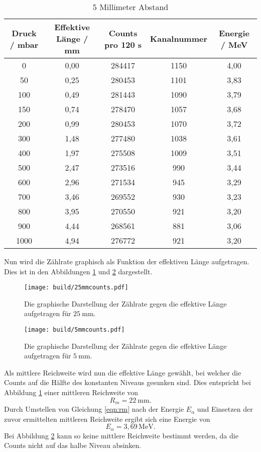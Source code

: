 \begin{table}
  \centering
  \caption{5 Millimeter Abstand}
  \label{tab:5mm}
  \begin{tabular}{c c c c c}
    \toprule
     Druck / \si{\milli\bar} & Effektive Länge / \si{\milli\metre} & Counts pro 120 \si{\second} & Kanalnummer & Energie / \si{\mega\electronvolt}\\
    \midrule
    0   & 0,00 & 284417 & 1150 & 4,00 \\
    50  & 0,25 & 280453 & 1101 & 3,83 \\
    100 & 0,49 & 281443 & 1090 & 3,79 \\
    150 & 0,74 & 278470 & 1057 & 3,68 \\
    200 & 0,99 & 280453 & 1070 & 3,72 \\
    300 & 1,48 & 277480 & 1038 & 3,61 \\
    400 & 1,97 & 275508 & 1009 & 3,51 \\
    500 & 2,47 & 273516 &  990 & 3,44 \\
    600 & 2,96 & 271534 &  945 & 3,29 \\
    700 & 3,46 & 269552 &  930 & 3,23 \\
    800 & 3,95 & 270550 &  921 & 3,20 \\
    900 & 4,44 & 268561 &  881 & 3,06 \\
    1000& 4,94 & 276772 &  921 & 3,20 \\
    \bottomrule
  \end{tabular}
\end{table}
\FloatBarrier
Nun wird die Zählrate graphisch als Funktion der effektiven Länge aufgetragen.
Dies ist in den Abbildungen \ref{fig:25mmcounts} und \ref{fig:5mmcounts} dargestellt.
\FloatBarrier
\begin{figure}
    \centering
    \texttt{[image: build/25mmcounts.pdf]}
    \caption{Die graphische Darstellung der Zählrate gegen die effektive Länge aufgetragen für $\SI{25}{\milli\metre}$.}
    \label{fig:25mmcounts}
\end{figure}

\begin{figure}
    \centering
    \texttt{[image: build/5mmcounts.pdf]}
  \caption{Die graphische Darstellung der Zählrate gegen die effektive Länge aufgetragen für $\SI{5}{\milli\metre}$.}
  \label{fig:5mmcounts}
\end{figure}
\FloatBarrier
Als mittlere Reichweite wird nun die effektive Länge gewählt, bei welcher die Counts auf die Hälfte des konstanten Niveaus gesunken sind.
Dies entspricht bei Abbildung \ref{fig:25mmcounts} einer mittleren Reichweite von
\begin{equation*}
  R_m = 22 \: \si{\milli\metre}.
 \end{equation*}
Durch Umstellen von Gleichung \ref{eqn:rm} nach der Energie $E_{\alpha}$ und Einsetzen der zuvor ermittelten mittleren Reichweite ergibt sich eine
Energie von
\begin{equation*}
  E_{\alpha} = 3,69 \, \si{\mega\electronvolt}.
\end{equation*}
Bei Abbildung \ref{fig:5mmcounts} kann so keine mittlere Reichweite bestimmt werden, da die Counts nicht auf das halbe Niveau absinken.

